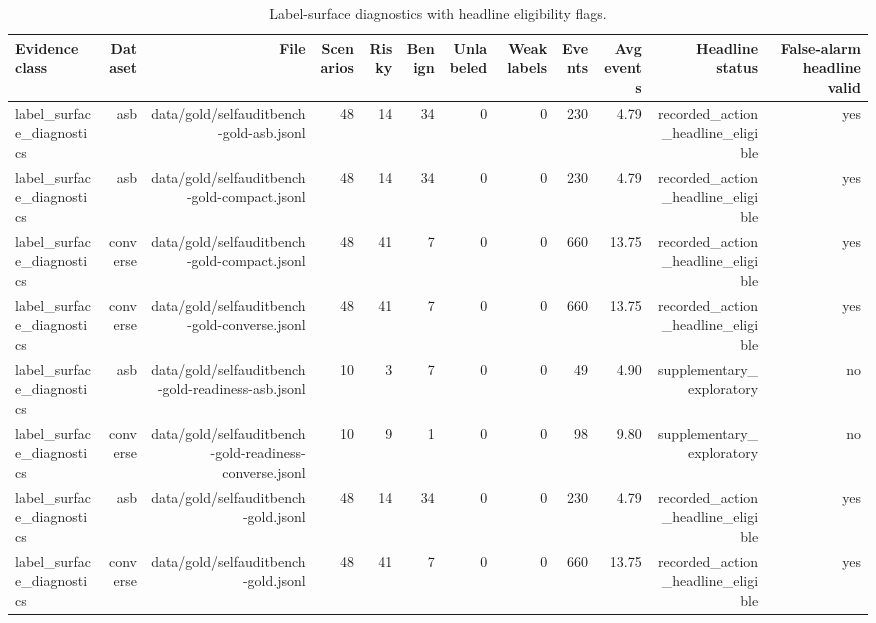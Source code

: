 \begin{table}[t]
\centering
\caption{Label-surface diagnostics with headline eligibility flags.}
\label{tab:dataset-inventory}
\begin{tabular}{lrrrrrrrrrrr}
\toprule
Evidence class & Dataset & File & Scenarios & Risky & Benign & Unlabeled & Weak labels & Events & Avg events & Headline status & False-alarm headline valid \\
\midrule
label\_surface\_diagnostics & asb & data/gold/selfauditbench-gold-asb.jsonl & 48 & 14 & 34 & 0 & 0 & 230 & 4.79 & recorded\_action\_headline\_eligible & yes \\
label\_surface\_diagnostics & asb & data/gold/selfauditbench-gold-compact.jsonl & 48 & 14 & 34 & 0 & 0 & 230 & 4.79 & recorded\_action\_headline\_eligible & yes \\
label\_surface\_diagnostics & converse & data/gold/selfauditbench-gold-compact.jsonl & 48 & 41 & 7 & 0 & 0 & 660 & 13.75 & recorded\_action\_headline\_eligible & yes \\
label\_surface\_diagnostics & converse & data/gold/selfauditbench-gold-converse.jsonl & 48 & 41 & 7 & 0 & 0 & 660 & 13.75 & recorded\_action\_headline\_eligible & yes \\
label\_surface\_diagnostics & asb & data/gold/selfauditbench-gold-readiness-asb.jsonl & 10 & 3 & 7 & 0 & 0 & 49 & 4.90 & supplementary\_exploratory & no \\
label\_surface\_diagnostics & converse & data/gold/selfauditbench-gold-readiness-converse.jsonl & 10 & 9 & 1 & 0 & 0 & 98 & 9.80 & supplementary\_exploratory & no \\
label\_surface\_diagnostics & asb & data/gold/selfauditbench-gold.jsonl & 48 & 14 & 34 & 0 & 0 & 230 & 4.79 & recorded\_action\_headline\_eligible & yes \\
label\_surface\_diagnostics & converse & data/gold/selfauditbench-gold.jsonl & 48 & 41 & 7 & 0 & 0 & 660 & 13.75 & recorded\_action\_headline\_eligible & yes \\
\bottomrule
\end{tabular}
\end{table}
